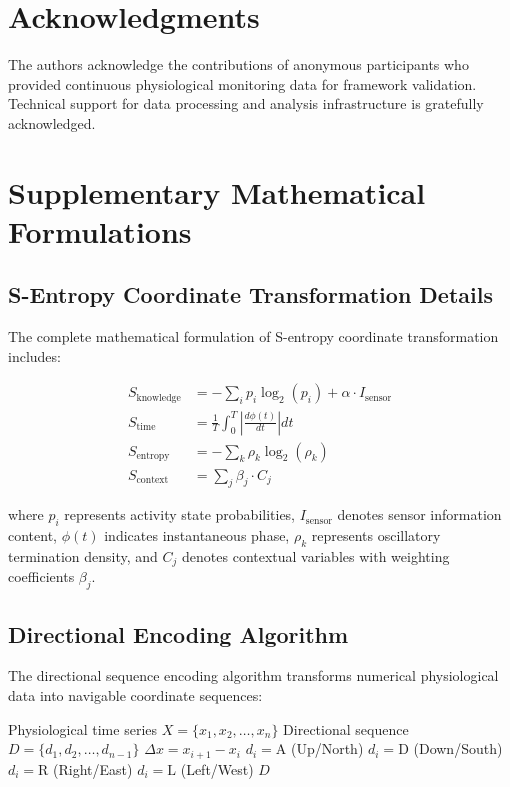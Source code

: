 \documentclass[12pt,a4paper]{article}
\theoremstyle{definition}
\begin{document}
\section{Acknowledgments}

The authors acknowledge the contributions of anonymous participants who provided continuous physiological monitoring data for framework validation. Technical support for data processing and analysis infrastructure is gratefully acknowledged.

\printbibliography

\appendix

\section{Supplementary Mathematical Formulations}

\subsection{S-Entropy Coordinate Transformation Details}

The complete mathematical formulation of S-entropy coordinate transformation includes:

\begin{align}
S_{\text{knowledge}} &= -\sum_{i} p_i \log_2(p_i) + \alpha \cdot I_{\text{sensor}} \\
S_{\text{time}} &= \frac{1}{T} \int_0^T \left|\frac{d\phi(t)}{dt}\right| dt \\
S_{\text{entropy}} &= -\sum_{k} \rho_k \log_2(\rho_k) \\
S_{\text{context}} &= \sum_{j} \beta_j \cdot C_j
\end{align}

where $p_i$ represents activity state probabilities, $I_{\text{sensor}}$ denotes sensor information content, $\phi(t)$ indicates instantaneous phase, $\rho_k$ represents oscillatory termination density, and $C_j$ denotes contextual variables with weighting coefficients $\beta_j$.

\subsection{Directional Encoding Algorithm}

The directional sequence encoding algorithm transforms numerical physiological data into navigable coordinate sequences:

\begin{algorithm}
\caption{Directional Sequence Encoding}
\begin{algorithmic}
\REQUIRE Physiological time series $X = \{x_1, x_2, \ldots, x_n\}$
\ENSURE Directional sequence $D = \{d_1, d_2, \ldots, d_{n-1}\}$
    \STATE $\Delta x = x_{i+1} - x_i$
        \STATE $d_i = \text{A}$ (Up/North)
        \STATE $d_i = \text{D}$ (Down/South)
        \STATE $d_i = \text{R}$ (Right/East)
    \ELSE
        \STATE $d_i = \text{L}$ (Left/West)
    \ENDIF
\ENDFOR
\RETURN $D$
\end{algorithmic}
\end{algorithm}
\end{document}
